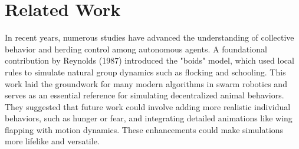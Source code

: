 \documentclass[9pt]{pnas-new}
\begin{document}



\section*{Related Work}

In recent years, numerous studies have advanced the understanding of collective behavior and herding control among autonomous agents. A foundational contribution by Reynolds (1987) \cite{reynols1987} introduced the "boids" model, which used local rules to simulate natural group dynamics such as flocking and schooling. This work laid the groundwork for many modern algorithms in swarm robotics and serves as an essential reference for simulating decentralized animal behaviors.  They suggested that future work could involve adding more realistic individual behaviors, such as hunger or fear, and integrating detailed animations like wing flapping with motion dynamics. These enhancements could make simulations more lifelike and versatile.
\end{document}

